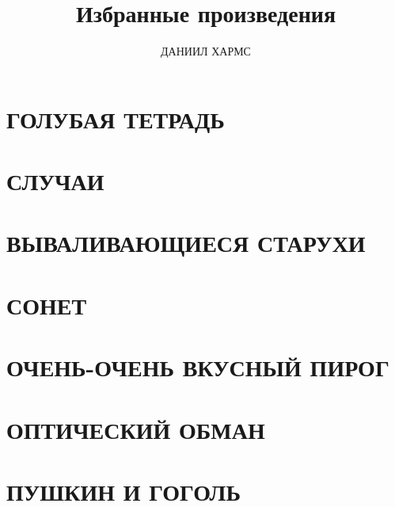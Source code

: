 \documentclass[12pt]{article}
\title{Избранные произведения}
\author{ДАНИИЛ ХАРМС}
\date{}
\begin{document}
\maketitle

\section{ГОЛУБАЯ ТЕТРАДЬ }


\section{СЛУЧАИ}


\section{ВЫВАЛИВАЮЩИЕСЯ СТАРУХИ}


\section{СОНЕТ}


\section{ОЧЕНЬ-ОЧЕНЬ ВКУСНЫЙ ПИРОГ}


\section{ОПТИЧЕСКИЙ ОБМАН}


\section{ПУШКИН И ГОГОЛЬ}

\end{document}
